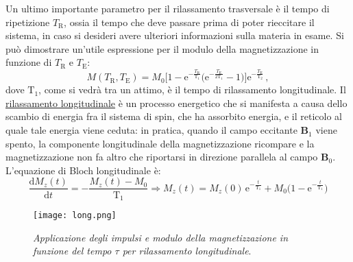 \documentclass{report}
\numberwithin{equation}{section}
\numberwithin{figure}{section}
\renewcommand{\Vec}{\bm}
\begin{document}
Un ultimo importante parametro per il rilassamento trasversale è il tempo di ripetizione $T_\mathrm{R}$, ossia il tempo che deve passare prima di poter rieccitare il sistema, in caso si desideri avere ulteriori informazioni sulla materia in esame. Si può dimostrare un'utile espressione per il modulo della magnetizzazione in funzione di $T_\mathrm{R}$ e $T_\mathrm{E}$:
\begin{equation}
    M(T_\mathrm{R},T_\mathrm{E})= M_0 \Big[1-\mathrm{e}^{-\frac{T_\mathrm{R}}{\mathrm{T_1}}} \Big(\mathrm{e}^{-\frac{T_\mathrm{E}}{2\mathrm{T_1}}}-1 \Big) \Big]\mathrm{e}^{-\frac{T_\mathrm{E}}{\mathrm{T_2}}}\,,
    \label{segnale}
\end{equation}
dove $\mathrm{T_1}$, come si vedrà tra un attimo, è il tempo di rilassamento longitudinale.
\newpage
Il \underline{rilassamento longitudinale} è un processo energetico che si manifesta a causa dello scambio di energia fra il sistema di spin, che ha assorbito energia, e il reticolo al quale tale energia viene ceduta: in pratica, quando il campo eccitante $\Vec{B}_1$ viene spento, la componente longitudinale della magnetizzazione ricompare e la magnetizzazione non fa altro che riportarsi in direzione parallela al campo $\Vec{B}_0$.\\
L'equazione di Bloch longitudinale è:
\begin{equation}
    \frac{\mathrm{d}M_z(t)}{\mathrm{d}t}=-\frac{M_z(t)-M_0}{\mathrm{T_1}} \Rightarrow \boxed{M_z(t)=M_z(0)\,\mathrm{e}^{-\frac{t}{\mathrm{T_1}}}+M_0 \Big(1-\mathrm{e}^{-\frac{t}{\mathrm{T_1}}} \Big)}
\end{equation}

\begin{wrapfigure}{R}{0.4\textwidth}
    \centering
    \texttt{[image: long.png]}
    \caption{\textit{Applicazione degli impulsi e modulo della magnetizzazione in funzione del tempo $\tau$ per rilassamento longitudinale}.}
    \label{fig:long}
\end{wrapfigure}
\end{document}
